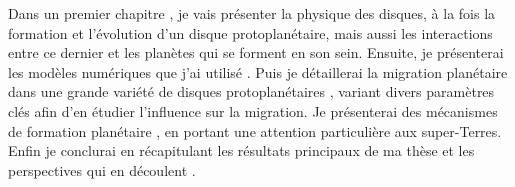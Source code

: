 Dans un premier chapitre , je vais présenter la physique des disques, à la fois la formation et l'évolution d'un disque protoplanétaire, mais aussi les interactions entre ce dernier et les planètes qui se forment en son sein. Ensuite, je présenterai les modèles numériques que j'ai utilisé . Puis je détaillerai la migration planétaire dans une grande variété de disques protoplanétaires , variant divers paramètres clés afin d'en étudier l'influence sur la migration. Je présenterai des mécanismes de formation planétaire , en portant une attention particulière aux super-Terres. Enfin je conclurai en récapitulant les résultats principaux de ma thèse et les perspectives qui en découlent .

